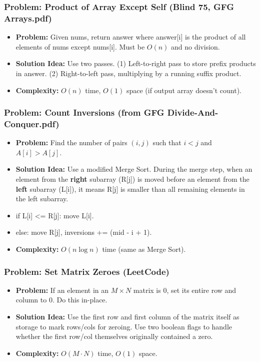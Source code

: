 \subsubsection{Problem: Product of Array Except Self (Blind 75, GFG Arrays.pdf)}
\begin{itemize}
\item \textbf{Problem:} Given nums, return answer where answer[i] is the product of all elements of nums except nums[i]. Must be $O(n)$ and no division.
\item \textbf{Solution Idea:} Use two passes. (1) Left-to-right pass to store prefix products in answer. (2) Right-to-left pass, multiplying by a running suffix product.
\item \textbf{Complexity:} $O(n)$ time, $O(1)$ space (if output array doesn't count).
\end{itemize}

\subsubsection{Problem: Count Inversions (from GFG Divide-And-Conquer.pdf)}
\begin{itemize}
\item \textbf{Problem:} Find the number of pairs $(i, j)$ such that $i < j$ and $A[i] > A[j]$.
\item \textbf{Solution Idea:} Use a modified Merge Sort. During the merge step, when an element from the \textbf{right} subarray (R[j]) is moved before an element from the \textbf{left} subarray (L[i]), it means R[j] is smaller than all remaining elements in the left subarray.
\item if L[i] <= R[j]: move L[i].
\item else: move R[j], inversions += (mid - i + 1).
\item \textbf{Complexity:} $O(n \log n)$ time (same as Merge Sort).
\end{itemize}

\subsubsection{Problem: Set Matrix Zeroes (LeetCode)}
\begin{itemize}
\item \textbf{Problem:} If an element in an $M \times N$ matrix is 0, set its entire row and column to 0. Do this in-place.
\item \textbf{Solution Idea:} Use the first row and first column of the matrix itself as storage to mark rows/cols for zeroing. Use two boolean flags to handle whether the first row/col themselves originally contained a zero.
\item \textbf{Complexity:} $O(M \cdot N)$ time, $O(1)$ space.
\end{itemize}

